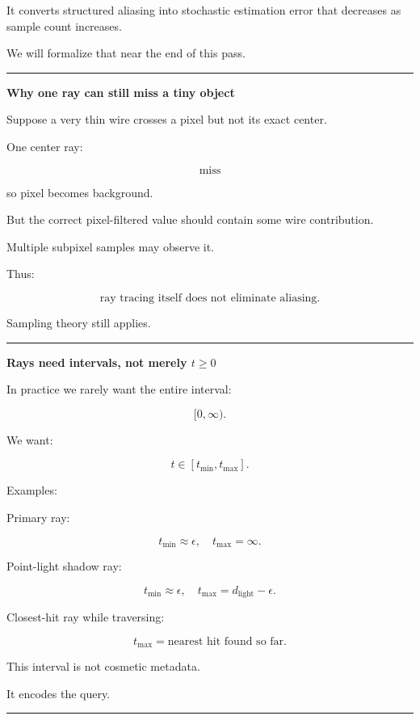 It converts structured aliasing into stochastic estimation error that decreases as sample count increases.

We will formalize that near the end of this pass.

\begin{center}\rule{0.5\linewidth}{0.5pt}\end{center}

\textbf{Why one ray can still miss a tiny object}

Suppose a very thin wire crosses a pixel but not its exact center.

One center ray:

\[
\text{miss}
\]

so pixel becomes background.

But the correct pixel-filtered value should contain some wire contribution.

Multiple subpixel samples may observe it.

Thus:

\[
\boxed{
\text{ray tracing itself does not eliminate aliasing}.
}
\]

Sampling theory still applies.

\begin{center}\rule{0.5\linewidth}{0.5pt}\end{center}

\textbf{Rays need intervals, not merely \(t\ge0\)}

In practice we rarely want the entire interval:

\[
[0,\infty).
\]

We want:

\[
\boxed{
t\in[t_{\min},t_{\max}].
}
\]

Examples:

Primary ray:

\[
t_{\min}\approx\epsilon,
\quad
t_{\max}=\infty.
\]

Point-light shadow ray:

\[
t_{\min}\approx\epsilon,
\quad
t_{\max}=d_{\text{light}}-\epsilon.
\]

Closest-hit ray while traversing:

\[
t_{\max}=
\text{nearest hit found so far}.
\]

This interval is not cosmetic metadata.

It encodes the query.

\begin{center}\rule{0.5\linewidth}{0.5pt}\end{center}

